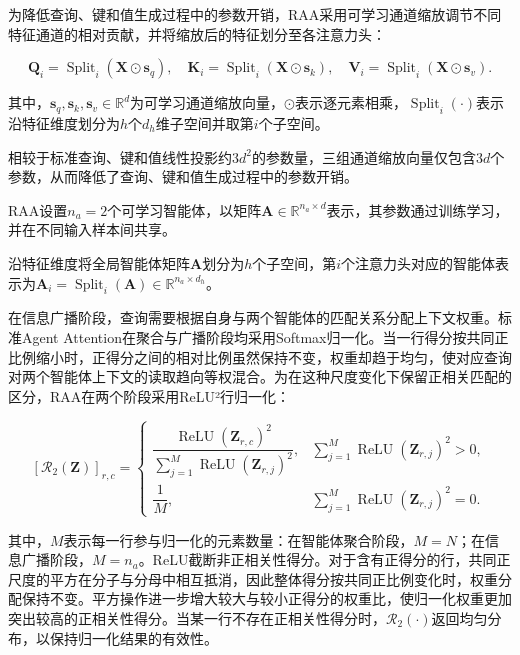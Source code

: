 为降低查询、键和值生成过程中的参数开销，RAA采用可学习通道缩放调节不同特征通道的相对贡献，并将缩放后的特征划分至各注意力头：

\begin{equation}
\mathbf Q_i=\operatorname{Split}_i(\mathbf X\odot\mathbf s_q),\quad
\mathbf K_i=\operatorname{Split}_i(\mathbf X\odot\mathbf s_k),\quad
\mathbf V_i=\operatorname{Split}_i(\mathbf X\odot\mathbf s_v).
\label{eq:raa_qkv_scaling}
\end{equation}

其中，$\mathbf s_q,\mathbf s_k,\mathbf s_v\in\mathbb R^d$为可学习通道缩放向量，$\odot$表示逐元素相乘，$\operatorname{Split}_i(\cdot)$表示沿特征维度划分为$h$个$d_h$维子空间并取第$i$个子空间。

相较于标准查询、键和值线性投影约$3d^2$的参数量，三组通道缩放向量仅包含$3d$个参数，从而降低了查询、键和值生成过程中的参数开销。

RAA设置$n_a=2$个可学习智能体，以矩阵$\mathbf A\in\mathbb R^{n_a\times d}$表示，其参数通过训练学习，并在不同输入样本间共享。

沿特征维度将全局智能体矩阵$\mathbf A$划分为$h$个子空间，第$i$个注意力头对应的智能体表示为$\mathbf A_i=\operatorname{Split}_i(\mathbf A)\in\mathbb R^{n_a\times d_h}$。

在信息广播阶段，查询需要根据自身与两个智能体的匹配关系分配上下文权重。标准Agent Attention在聚合与广播阶段均采用Softmax归一化。当一行得分按共同正比例缩小时，正得分之间的相对比例虽然保持不变，权重却趋于均匀，使对应查询对两个智能体上下文的读取趋向等权混合。为在这种尺度变化下保留正相关匹配的区分，RAA在两个阶段采用ReLU²行归一化：

\begin{equation}
\left[\mathcal R_2(\mathbf Z)\right]_{r,c}
=
\begin{cases}
\dfrac{\operatorname{ReLU}(\mathbf Z_{r,c})^2}
{\sum_{j=1}^{M}\operatorname{ReLU}(\mathbf Z_{r,j})^2},
&
\sum_{j=1}^{M}\operatorname{ReLU}(\mathbf Z_{r,j})^2>0,\\[10pt]
\dfrac{1}{M},
&
\sum_{j=1}^{M}\operatorname{ReLU}(\mathbf Z_{r,j})^2=0.
\end{cases}
\label{eq:relu2_normalization}
\end{equation}

其中，$M$表示每一行参与归一化的元素数量：在智能体聚合阶段，$M=N$；在信息广播阶段，$M=n_a$。ReLU截断非正相关性得分。对于含有正得分的行，共同正尺度的平方在分子与分母中相互抵消，因此整体得分按共同正比例变化时，权重分配保持不变。平方操作进一步增大较大与较小正得分的权重比，使归一化权重更加突出较高的正相关性得分。当某一行不存在正相关性得分时，$\mathcal R_2(\cdot)$返回均匀分布，以保持归一化结果的有效性。

